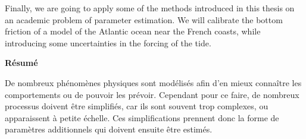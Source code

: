 Finally, we are going to apply some of the methods introduced in this
thesis on an academic problem of parameter estimation. We will
calibrate the bottom friction of a model of the Atlantic ocean near
the French coasts, while introducing some uncertainties in the forcing
of the tide.



%
%
%

\vspace{1cm}
\etoile
\vspace{1cm}
\begin{center}
  \bf Résumé
\end{center}
\vspace{0.5cm}

De nombreux phénomènes physiques sont modélisés afin
d'en mieux connaître les comportements ou de pouvoir les
prévoir. Cependant pour ce faire, de nombreux processus doivent être
simplifiés, car ils sont souvent trop complexes, ou apparaissent à
petite échelle. Ces simplifications prennent donc la forme de
paramètres additionnels qui doivent ensuite être estimés.

